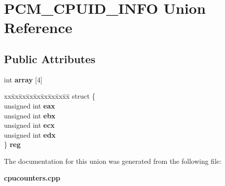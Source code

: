 \section{P\+C\+M\+\_\+\+C\+P\+U\+I\+D\+\_\+\+I\+N\+FO Union Reference}
\label{unionPCM__CPUID__INFO}
\subsection*{Public Attributes}
\begin{DoxyCompactItemize}
\item 
\mbox{\label{unionPCM__CPUID__INFO_ad6b8b5c108abcb429d64f6c27f4febe0}} 
int {\bfseries array} [4]
\item 
\mbox{\label{unionPCM__CPUID__INFO_a3cbe455b90d595f4a219f618300551d1}} 
\begin{tabbing}
xx\=xx\=xx\=xx\=xx\=xx\=xx\=xx\=xx\=\kill
struct \{\\
\>unsigned int {\bfseries eax}\\
\>unsigned int {\bfseries ebx}\\
\>unsigned int {\bfseries ecx}\\
\>unsigned int {\bfseries edx}\\
\} {\bfseries reg}\\

\end{tabbing}\end{DoxyCompactItemize}


The documentation for this union was generated from the following file\+:\begin{DoxyCompactItemize}
\item 
\textbf{ cpucounters.\+cpp}\end{DoxyCompactItemize}
